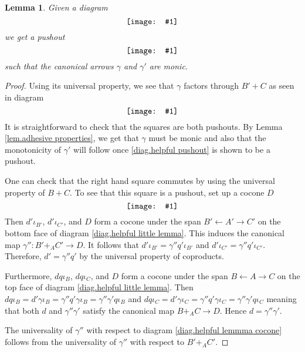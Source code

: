 \documentclass[11pt]{amsart}
\newcommand{\from}{\colon}
\newcommand{\diagram}[1]{\raisebox{-0.5\height}{\texttt{[image: \#1]}}}
\newtheorem{lem}[thm]{Lemma}
\theoremstyle{remark}
\theoremstyle{definition}
\begin{document}
\begin{lem} 
	\label{lem.helpful little lemma}
	Given a diagram
	\begin{equation} 
		\label{diag.helpful little lemma}
		\diagram{Diag_HelpfulLittleLemma}
	\end{equation}
	we get a pushout
	\begin{equation}
		\label{diag.helpful pushout}
		\diagram{Diag_HelpfulPushout}
	\end{equation}
	such that the canonical arrows $\gamma$ 
	and $\gamma'$ are monic.
\end{lem}
\begin{proof}
	Using its universal property, we see that 
	$\gamma$ factors through $B'+C$ as seen in 
	diagram
	\[
		\label{NoRef_HelpfulLemmaProof1}
		\diagram{NoRef_HelpfulLemmaProof1}
	\]
	It is straightforward to check that the squares are both pushouts. By Lemma \ref{lem.adhesive properties}, we get that $\gamma$ must be monic and also that the monotonicity of $\gamma'$ will follow once \eqref{diag.helpful pushout} is shown to be a pushout.
	
	One can check that the right hand square commutes by using the universal property of $B+C$. To see that this square is a pushout, set up a cocone $D$
	\begin{equation} 
		\label{diag.helpful lemmma cocone}
		\diagram{Diag_HelpfulLemmmaCocone}
	\end{equation}
	Then $d'\iota_{B'}$, $d'\iota_{C'}$, and $D$ form a cocone under the span $B' \leftarrow A' \to C'$ on the bottom face of diagram \eqref{diag.helpful little lemma}. This induces the canonical map $\gamma'' \from B'+_AC' \to D$.  It follows that $d'\iota_{B'}=\gamma'' q' \iota_{B'}$ and $d'\iota_{C'}=\gamma'' q' \iota_{C'}$. Therefore, $d'=\gamma'' q'$ by the universal property of coproducts.
	
	Furthermore, $dq\iota_B$, $dq\iota_C$, and $D$ form a cocone under the span $B \leftarrow A \to C$ on the top face of diagram \eqref{diag.helpful little lemma}. Then $dq\iota_B = d'\gamma\iota_B = \gamma'' q'\gamma\iota_B = \gamma'' \gamma' q \iota_B$ and $dq\iota_C = d'\gamma\iota_C = \gamma'' q'\gamma\iota_C = \gamma'' \gamma' q \iota_C$ meaning that both $d$ and $\gamma''\gamma'$ satisfy the canonical map $B+_AC \to D$.  Hence $d=\gamma''\gamma'$. 
	
	The universality of $\gamma''$ with respect to diagram \eqref{diag.helpful lemmma cocone} follows from the universality of $\gamma''$ with respect to $B'+_AC'$.
\end{proof}
%
%
%
%
%
%
\end{document}

